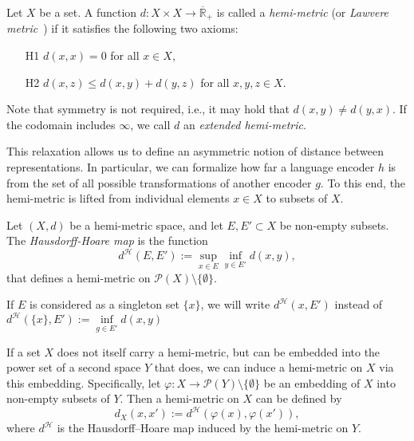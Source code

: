 \begin{definition}\label{def:hemi_metric}
Let \( X \) be a set.  
A function \( d \colon X \times X \to \overline{\mathbb{R}}_+ \) is called a \emph{hemi-metric} (or \emph{Lawvere metric}~\cite{lawvere_metric_1973}) if it satisfies the following two axioms:
\begin{itemize}
    \item [H1] \( d(x, x) = 0 \) for all \( x \in X \),
    \item [H2] \( d(x, z) \le d(x, y) + d(y, z) \) for all \( x, y, z \in X \).
\end{itemize}
Note that symmetry is not required, i.e., it may hold that \( d(x, y) \ne d(y, x) \).  
If the codomain includes \( \infty \), we call \( d \) an \emph{extended hemi-metric}.
\end{definition}



This relaxation allows us to define an asymmetric notion of distance between representations.
In particular, we can formalize how far a language encoder \( h \) is from the set of all possible transformations of another encoder \( g \).
To this end, the hemi-metric is lifted from individual elements \( x \in X \) to subsets of \( X \).
\begin{definition}\label{def:hausdorffHoareMap}
Let $(X,d)$ be a hemi-metric space, and let $E, E' \subset X$ be non-empty subsets.  
The \emph{Hausdorff-Hoare map} is the function
\[
d^{\mathcal{H}}(E, E') := \sup_{x \in E} \inf_{y \in E'} d(x, y),
\]
that defines a hemi-metric on $\mathcal{P}(X) \setminus \{\emptyset\}$.
\end{definition}

If $E$ is considered as a singleton set $\{x\}$, we will write $d^\mathcal{H}(x,E')$ instead of $d^\mathcal{H}(\{x\},E'):=\inf\limits_{g\in E'}d(x,y)$

If a set \( X \) does not itself carry a hemi-metric, but can be embedded into the power set of a second space \( Y \) that does, we can induce a hemi-metric on \( X \) via this embedding.  
Specifically, let \( \varphi: X \to \mathcal{P}(Y) \setminus \{\emptyset\} \) be an embedding of \( X \) into non-empty subsets of \( Y \).  
Then a hemi-metric on \( X \) can be defined by
\[
d_X(x, x') := d^\mathcal{H}(\varphi(x), \varphi(x')),
\]
where \( d^\mathcal{H} \) is the Hausdorff–Hoare map induced by the hemi-metric on \( Y \).


